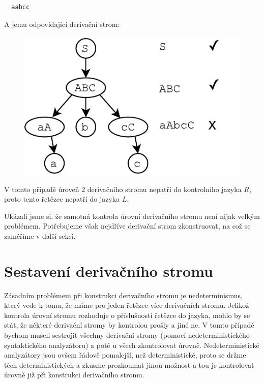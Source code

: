 \begin{exmp}
  \begin{lstlisting}
  aabcc
  \end{lstlisting}

  \noindent
  A jemu odpovídající derivační strom:
  \begin{figure}[H]
    \centering
    \includegraphics{fig/TreeControlledGrammar2.pdf}
  \end{figure}

  \noindent
  V tomto případě úroveň 2 derivačního stromu nepatří do kontrolního jazyka $R$,
  proto tento řetězec nepatří do jazyka $L$.
\end{exmp}

Ukázali jsme si, že samotná kontrola úrovní derivačního stromu není nijak
velkým problémem. Potřebujeme však nejdříve derivační strom zkonstruovat,
na což se zaměříme v další sekci.

\section{Sestavení derivačního stromu}

Zásadním problémem při konstrukci derivačního stromu je nedeterminismus,
který vede k tomu, že máme pro jeden řetězec více derivačních stromů.
Jelikož kontrola úrovní stromu rozhoduje o příslušnosti řetězce do jazyka,
mohlo by se stát, že některé derivační stromy by kontrolou prošly a jiné ne.
V tomto případě bychom museli sestrojit všechny derivační stromy (pomocí
nedeterministického syntaktického analyzátoru) a poté
u všech zkontrolovat úrovně. Nedeterministické analyzátory jsou ovšem řádově
pomalejší, než deterministické, proto se držme těch deterministických a
zkusme prozkoumat jinou možnost a tou je kontrolovat úrovně již při konstrukci
derivačního stromu.\\

